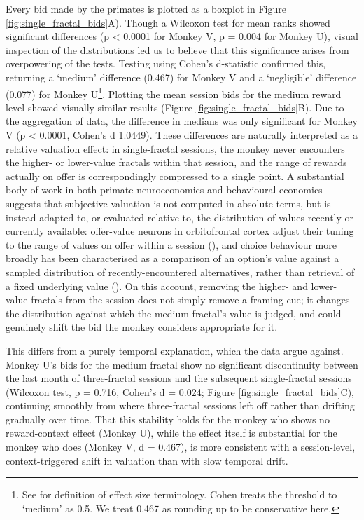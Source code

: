 Every bid made by the primates is plotted as a boxplot in Figure \ref{fig:single_fractal_bids}A). Though a Wilcoxon test for mean ranks showed significant differences (p < 0.0001 for Monkey V, p = 0.004 for Monkey U), visual inspection of the distributions led us to believe that this significance arises from overpowering of the tests. Testing using Cohen’s d-statistic confirmed this, returning a ‘medium’ difference (0.467) for Monkey V and a ‘negligible’ difference (0.077) for Monkey U\footnote{See \cite{cohenStatisticalPowerAnalysis1992} for definition of effect size terminology. Cohen treats the threshold to ‘medium’ as 0.5. We treat 0.467 as rounding up to be conservative here.}. Plotting the mean session bids for the medium reward level showed visually similar results (Figure \ref{fig:single_fractal_bids}B). Due to the aggregation of data, the difference in medians was only significant for Monkey V (p < 0.0001, Cohen’s d 1.0449). These differences are naturally interpreted as a relative valuation effect: in single-fractal sessions, the monkey never encounters the higher- or lower-value fractals within that session, and the range of rewards actually on offer is correspondingly compressed to a single point. A substantial body of work in both primate neuroeconomics and behavioural economics suggests that subjective valuation is not computed in absolute terms, but is instead adapted to, or evaluated relative to, the distribution of values recently or currently available: offer-value neurons in orbitofrontal cortex adjust their tuning to the range of values on offer within a session (\cite{padoa-schioppaRangeAdaptingRepresentationEconomic2009}), and choice behaviour more broadly has been characterised as a comparison of an option's value against a sampled distribution of recently-encountered alternatives, rather than retrieval of a fixed underlying value (\cite{stewartDecisionSampling2006}). On this account, removing the higher- and lower-value fractals from the session does not simply remove a framing cue; it changes the distribution against which the medium fractal's value is judged, and could genuinely shift the bid the monkey considers appropriate for it.

This differs from a purely temporal explanation, which the data argue against.
Monkey U's bids for the medium fractal show no significant discontinuity between the last month of three-fractal sessions and the subsequent single-fractal sessions
(Wilcoxon test, p = 0.716, Cohen's d = 0.024; Figure \ref{fig:single_fractal_bids}C),
continuing smoothly from where three-fractal sessions left off rather than drifting gradually over time.
That this stability holds for the monkey who shows no reward-context effect (Monkey U),
while the effect itself is substantial for the monkey who does (Monkey V, d = 0.467),
is more consistent with a session-level, context-triggered shift in valuation than with slow temporal drift.

